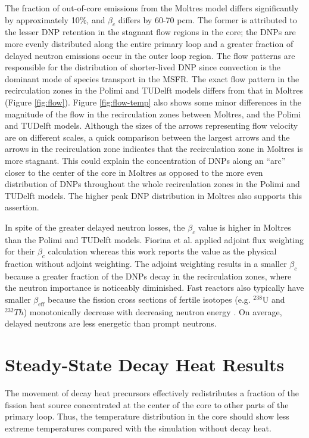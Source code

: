 The fraction of out-of-core emissions from the Moltres model
differs significantly by approximately 10\%, and $\beta_c$ differs by
60-70 pcm. The former is attributed to the lesser \gls{DNP} retention in the
stagnant flow regions in the core; the \glspl{DNP} are more evenly distributed
along the entire primary loop and a greater fraction of delayed neutron
emissions occur in the outer loop region. The flow patterns are responsible
for the distribution of shorter-lived \gls{DNP} since convection is the
dominant mode of species transport in the \gls{MSFR}. The exact flow pattern
in the recirculation zones in the Polimi and TUDelft models differs from
that in Moltres (Figure \ref{fig:flow}). Figure \ref{fig:flow-temp} also shows
some minor differences in the magnitude of the flow in the recirculation zones
between Moltres, and the Polimi and TUDelft models. Although the sizes of the
arrows representing flow velocity are on different scales, a
quick comparison between the largest arrows and the arrows in the
recirculation zone indicates that the recirculation zone in Moltres is
more stagnant. This could explain the concentration of \glspl{DNP}
along an ``arc'' closer to the center of the core in Moltres as opposed to the
more even distribution of \glspl{DNP} throughout the whole recirculation zones
in the Polimi and TUDelft models. The higher peak \gls{DNP} distribution in
Moltres also supports this assertion.

In spite of the greater delayed neutron losses, the $\beta_c$ value is higher
in Moltres than the Polimi and TUDelft models. Fiorina et al.
\cite{fiorina_modelling_2014} applied adjoint flux
weighting for their $\beta_c$ calculation whereas this work
reports the value as the physical fraction without adjoint weighting. The
adjoint weighting results in a smaller $\beta_c$ because a greater
fraction of the \glspl{DNP} decay in the recirculation zones, where the
neutron importance is noticeably diminished. Fast reactors also typically have
smaller $\beta_{\text{eff}}$ because the fission cross sections of fertile
isotopes (e.g. $^{238}$U and $^{232}Th$) monotonically decrease with
decreasing neutron energy \cite{ott_introductory_1985}. On average, delayed
neutrons are less energetic than prompt neutrons.

\section{Steady-State Decay Heat Results}

The movement of decay heat precursors effectively redistributes a fraction of
the fission heat source concentrated at the center of the core to other parts
of the primary loop. Thus, the temperature distribution in the core should
show less extreme temperatures compared with the simulation without decay
heat.

